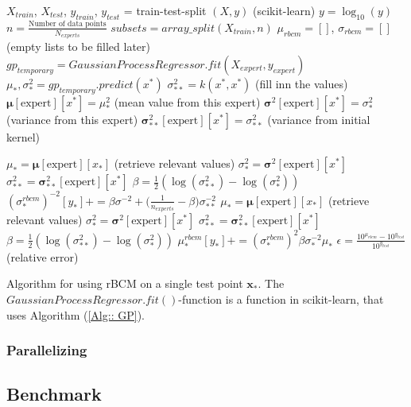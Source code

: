 \documentclass[twoside,english]{uiofysmaster}
\begin{document}
\begin{algorithm}
$X_{train}$, $X_{test}$, $y_{train}$, $y_{test}$ = train-test-split $(X, y)$ (scikit-learn) \;
$y = \log_{10} (y)$ \;
$n = \frac{\text{Number of data points}}{N_{experts}}$ \;
$subsets = array\_split (X_{train}, n)$ \;
$\mu_{rbcm} = []$, $\sigma_{rbcm} = []$  (empty lists to be filled later)\; 
{
$gp_{temporary} = GaussianProcessRegressor.fit(X_{expert}, y_{expert})$ \;
 {
 $\mu_*,\sigma_*^2 = gp_{temporary}.predict(x^*)$ \;
 $\sigma_{**}^2 = k (x^*, x^*)$ \;
 (fill inn the values) \;
 $\boldsymbol{\mu}[\text{expert}][x^*] = \mu_*^2$ (mean value from this expert)\;
 $\boldsymbol{\sigma}^2[\text{expert}][x^*] = \sigma_*^2$ (variance from this expert)\;
 $\boldsymbol{\sigma}_{**}^2[\text{expert}][x^*] = \sigma_{**}^2$ (variance from initial kernel)
 }
}
 
{ 
{ $\mu_* = \boldsymbol{\mu}[\text{expert}][x_*]$ (retrieve relevant values)\;
$\sigma_*^2 = \boldsymbol{\sigma}^2[\text{expert}][x^*]$ \;
$\sigma_{**}^2 = \boldsymbol{\sigma}_{**}^2[\text{expert}][x^*]$ \; 
$\beta = \frac{1}{2} (\log (\sigma_{**}^2) - \log (\sigma_*^2))$ \;
$(\sigma_*^{rbcm})^{-2}[y_*] += \beta \sigma^{-2} + \big(\frac{1}{n_{experts}} - \beta \big) \sigma_{**}^{-2} $ }
 }  
{
 {
$\mu_* = \boldsymbol{\mu}[\text{expert}][x_*]$ (retrieve relevant values)\;
$\sigma_*^2 = \boldsymbol{\sigma}^2[\text{expert}][x^*]$ \;
$\sigma_{**}^2 = \boldsymbol{\sigma}_{**}^2[\text{expert}][x^*]$ \; 
$\beta = \frac{1}{2} (\log (\sigma_{**}^2) - \log (\sigma_*^2))$ \;
$\mu_*^{rbcm}[y_*] += (\sigma_*^{rbcm})^2 \beta \sigma^{-2}_* \mu_*$
 }
} 
$\epsilon = \frac{10^{\mu_{rbcm}} - 10^{y_{test}}}{10^{y_{test}}}$ (relative error)\;
 \caption{Algorithm for using rBCM on a single test point $\textbf{x}_*$. The $GaussianProcessRegressor.fit()$-function is a function in scikit-learn, that uses Algorithm (\ref{Alg:: GP}). }
\label{Alg:: DGP}
\end{algorithm}

\subsubsection{Parallelizing}

\subsection{Benchmark}





\end{document}

